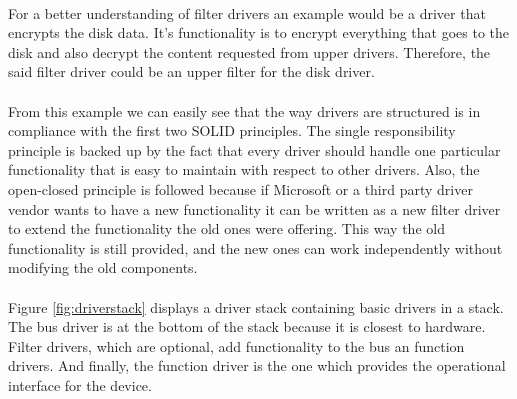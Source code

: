 	   	\paragraph{}
	   	For a better understanding of filter drivers an example would be a driver that encrypts the disk data. It's functionality is to encrypt everything that goes to the disk and also decrypt the content requested from upper drivers. Therefore, the said filter driver could be an upper filter for the disk driver.
	   
	   	\paragraph{}
	   	From this example we can easily see that the way drivers are structured is in compliance with the first two SOLID principles. The single responsibility principle is backed up by the fact that every driver should handle one particular functionality that is easy to maintain with respect to other drivers. Also, the open-closed principle is followed because if Microsoft or a third party driver vendor wants to have a new functionality it can be written as a new filter driver to extend the functionality the old ones were offering. This way the old functionality is still provided, and the new ones can work independently without modifying the old components.
	   
	   	\paragraph{}
	   	Figure \ref{fig:driverstack} displays a driver stack containing basic drivers in a stack. The bus driver is at the bottom of the stack because it is closest to hardware. Filter drivers, which are optional, add functionality to the bus an function drivers. And finally, the function driver is the one which provides the operational interface for the device.
	    
